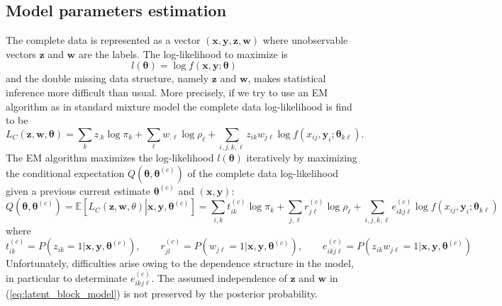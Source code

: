 \documentclass[a4paper]{article}
\newcommand{\bw}{\mathbf{w}}
\newcommand{\bx}{\mathbf{x}}
\newcommand{\by}{\mathbf{y}}
\newcommand{\bz}{\mathbf{z}}
\newcommand{\btheta}{\boldsymbol{\theta}}
\newcommand{\Econd}[2]{\mathbb{E}\left[#1\left|#2\right.\right]}
\begin{document}
\subsection{Model parameters estimation}
\label{sec:Model parameters estimation}
The complete data is represented as a vector $(\bx,\by,\bz,\bw)$
where unobservable vectors $\bz$ and $\bw$ are the labels. The log-likelihood to maximize is
\begin{equation}
  \label{eq:loglikelihood}
  l(\btheta)=\log f(\bx,\by;\btheta)
\end{equation}
and the double missing data structure, namely $\bz$ and $\bw$, makes statistical inference more difficult than usual. More precisely, if we try to use an EM algorithm as in standard mixture model \cite{Dempster} the complete data log-likelihood is find to be
\begin{equation}\label{eq:Lc_bloc_latent}
 L_C(\bz,\bw,\btheta)=\sum_k z_{.k} \log \pi_k + \sum_\ell w_{.\ell} \log \rho_\ell
  + \sum_{i,j,k,\ell} z_{ik}w_{j\ell}\log f(x_{ij},\by_i;\btheta_{k\ell}).
\end{equation}
The EM algorithm maximizes the log-likelihood $l(\btheta)$ iteratively by maximizing the conditional expectation $Q(\btheta,\btheta^{(c)})$ of the complete data log-likelihood given a previous current estimate
$\btheta^{(c)}$ and $(\bx,\by)$:
\begin{equation*}
  Q(\btheta,\btheta^{(c)})
  =\Econd{L_C(\bz,\bw,\theta)}{{\bx,\by,\btheta^{(c)}}}
  = \sum_{i,k}  t_{ik}^{(c)} \log \pi_k
  + \sum_{j,\ell} r_{j\ell}^{(c)} \log \rho_\ell
  + \sum_{i,j,k,\ell}  e_{ikj\ell}^{(c)} \log f(x_{ij},\by_i;\btheta_{k\ell})
\end{equation*}
where
\begin{equation*}
  t_{ik}^{(c)}=P(z_{ik}=1|\bx,\by,\btheta^{(c)}), \qquad
  r_{jl}^{(c)}=P(w_{j\ell}=1|\bx,\by,\btheta^{(c)}), \qquad
  e_{ikj\ell}^{(c)} = P(z_{ik}w_{j\ell}=1|\bx,\by, \btheta^{(c)})
\end{equation*}
Unfortunately, difficulties arise owing to the dependence structure in the model, in particular to determinate $e_{ikj\ell}^{(c)}$. The assumed independence of $\bz$ and $\bw$ in (\ref{eq:latent_block_model}) is not preserved by the posterior probability.
\end{document}
